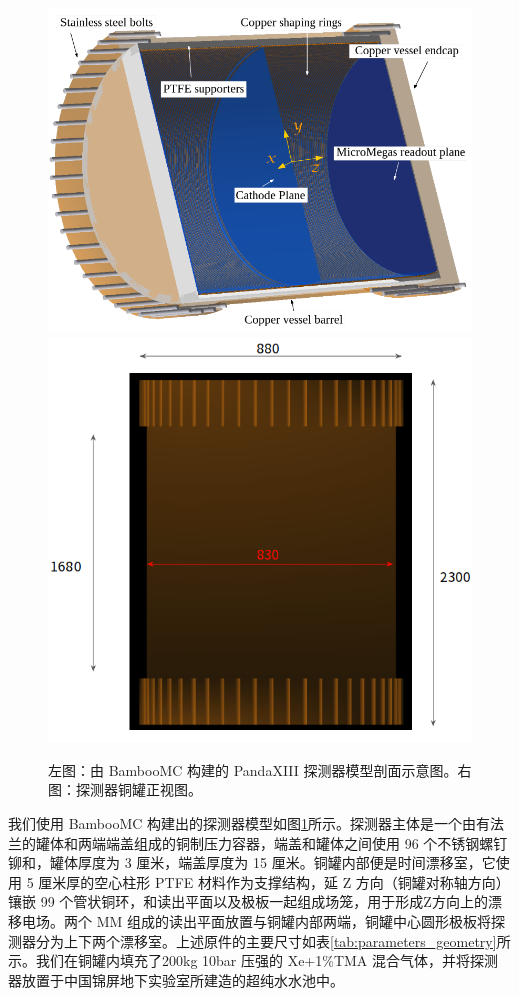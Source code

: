 \begin{figure}[tbh]
    \centering
    \includegraphics[width=0.4\columnwidth]{pic/fig3.png}
    \includegraphics[width=0.4\columnwidth]{pic/fig5.png}
    \caption{左图：由 BambooMC 构建的 PandaXIII 探测器模型剖面示意图。右图：探测器铜罐正视图。}
    \label{fig:detector_bamboomc}
\end{figure}

我们使用 BambooMC 构建出的探测器模型如图\ref{fig:detector_bamboomc}所示。探测器主体是一个由有法兰的罐体和两端端盖组成的铜制压力容器，端盖和罐体之间使用 96 个不锈钢螺钉铆和，罐体厚度为 3 厘米，端盖厚度为 15 厘米。铜罐内部便是时间漂移室，它使用 5 厘米厚的空心柱形 PTFE 材料作为支撑结构，延 Z 方向（铜罐对称轴方向）镶嵌 99 个管状铜环，和读出平面以及极板一起组成场笼，用于形成Z方向上的漂移电场。两个 MM 组成的读出平面放置与铜罐内部两端，铜罐中心圆形极板将探测器分为上下两个漂移室。上述原件的主要尺寸如表\ref{tab:parameters_geometry}所示。我们在铜罐内填充了200kg 10bar 压强的 Xe+1\%TMA 混合气体，并将探测器放置于中国锦屏地下实验室所建造的超纯水水池中。

